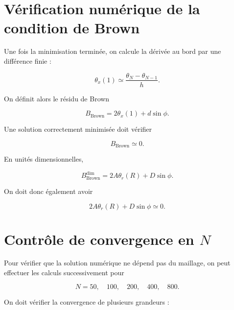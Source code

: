 \documentclass[a4paper,11pt]{article}
\begin{document}
\section{Vérification numérique de la condition de Brown}

Une fois la minimisation terminée, on calcule la dérivée au bord par une
différence finie :

\begin{equation}
\theta_x(1)
\simeq
\frac{\theta_N-\theta_{N-1}}{h}.
\end{equation}

On définit alors le résidu de Brown

\begin{equation}
\boxed{
B_{\mathrm{Brown}}
=
2\theta_x(1)
+
d\sin\phi.
}
\end{equation}

Une solution correctement minimisée doit vérifier

\begin{equation}
\boxed{
B_{\mathrm{Brown}}\simeq0.
}
\end{equation}

En unités dimensionnelles,

\begin{equation}
B_{\mathrm{Brown}}^{\mathrm{dim}}
=
2A\theta_r(R)
+
D\sin\phi.
\end{equation}

On doit donc également avoir

\begin{equation}
\boxed{
2A\theta_r(R)+D\sin\phi\simeq0.
}
\end{equation}

\section{Contrôle de convergence en $N$}

Pour vérifier que la solution numérique ne dépend pas du maillage, on peut
effectuer les calculs successivement pour

\begin{equation}
N=50,\quad100,\quad200,\quad400,\quad800.
\end{equation}

On doit vérifier la convergence de plusieurs grandeurs :
\end{document}
